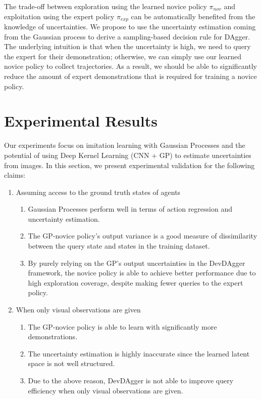 \documentclass[11pt, reqno, letterpaper, twoside]{amsart}
\begin{document}
The trade-off between exploration using the learned novice policy $\pi_{nov}$ and exploitation using the expert policy $\pi_{exp}$ can be automatically benefited from the knowledge of uncertainties. We propose to use the uncertainty estimation coming from the Gaussian process to derive a sampling-based decision rule for DAgger. The underlying intuition is that when the uncertainty is high, we need to query the expert for their demonstration; otherwise, we can simply use our learned novice policy to collect trajectories. As a result, we should be able to significantly reduce the amount of expert demonstrations that is required for training a novice policy.


\section{Experimental Results}
Our experiments focus on imitation learning with Gaussian Processes and the potential of using Deep Kernel Learning (CNN + GP) to estimate uncertainties from images. In this section, we present experimental validation for the following claims:
\begin{enumerate}
    \item Assuming access to the ground truth states of agents
    \begin{enumerate}
        \item Gaussian Processes perform well in terms of action regression and uncertainty estimation.
        \item The GP-novice policy’s output variance is a good measure of dissimilarity between the query state and states in the training dataset.
        \item By purely relying on the GP's output uncertainties in the DevDAgger framework, the novice policy is able to achieve better performance due to high exploration coverage, despite making fewer queries to the expert policy.
    \end{enumerate}
    
    \item When only visual observations are given
    \begin{enumerate}
        \item The GP-novice policy is able to learn with significantly more demonstrations.
        \item The uncertainty estimation is highly inaccurate since the learned latent space is not well structured.
        \item Due to the above reason, DevDAgger is not able to improve query efficiency when only visual observations are given.
    \end{enumerate}
\end{enumerate}
\end{document}
